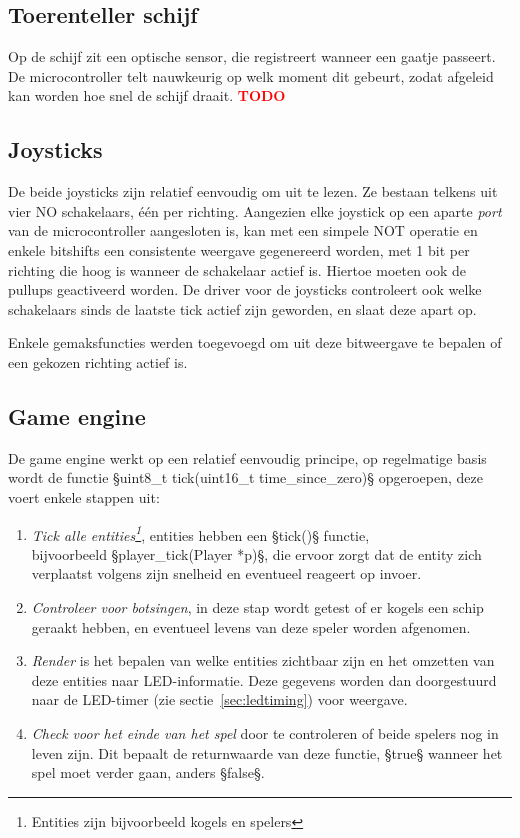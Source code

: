 \documentclass[a4paper, 12pt]{article}
\newcommand{\TODO}[1]{\textcolor{red}{\large\textbf{TODO}}\todo{#1}}
\begin{document}
\subsection{Toerenteller schijf}
Op de schijf zit een optische sensor, die registreert wanneer een gaatje
passeert. De microcontroller telt nauwkeurig op welk moment dit gebeurt,
zodat afgeleid kan worden hoe snel de schijf draait.
\TODO{Info toerenteller}

\subsection{Joysticks}
De beide joysticks zijn relatief eenvoudig om uit te lezen.
Ze bestaan telkens uit vier NO schakelaars, één per richting.
Aangezien elke joystick op een aparte \emph{port} van de microcontroller
aangesloten is, kan met een simpele NOT operatie en enkele bitshifts een
consistente weergave gegenereerd worden, met 1 bit per richting die hoog is
wanneer de schakelaar actief is. Hiertoe moeten ook de pullups geactiveerd
worden. De driver voor de joysticks controleert ook welke schakelaars sinds de
laatste tick actief zijn geworden, en slaat deze apart op.

Enkele gemaksfuncties werden toegevoegd om uit deze bitweergave te bepalen of
een gekozen richting actief is.

\subsection{Game engine}
De game engine werkt op een relatief eenvoudig principe,
op regelmatige basis wordt de functie §uint8_t tick(uint16_t time_since_zero)§
opgeroepen,
deze voert enkele stappen uit:
\begin{enumerate}
  \item \emph{Tick alle entities\footnote{Entities zijn bijvoorbeeld kogels en
        spelers}}, entities hebben een §tick()§ functie,\\
    bijvoorbeeld §player_tick(Player *p)§, die ervoor zorgt dat de entity zich
    verplaatst volgens zijn snelheid en eventueel reageert op invoer.

  \item \emph{Controleer voor botsingen}, in deze stap wordt getest of er
    kogels een schip geraakt hebben, en eventueel levens van deze speler worden
    afgenomen.

  \item \emph{Render} is het bepalen van welke entities zichtbaar zijn en het
    omzetten van deze entities naar LED-informatie. Deze gegevens worden dan
    doorgestuurd naar de LED-timer (zie sectie~\ref{sec:ledtiming}) voor weergave.

  \item \emph{Check voor het einde van het spel} door te controleren of beide
    spelers nog in leven zijn. Dit bepaalt de returnwaarde van deze functie,
    §true§ wanneer het spel moet verder gaan, anders §false§.
\end{enumerate}
\end{document}
